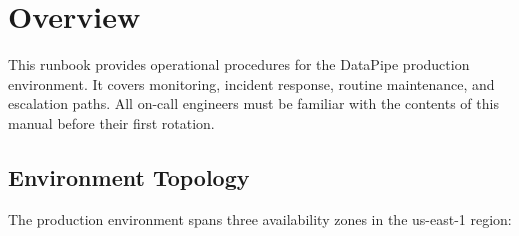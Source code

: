 \documentclass[
    language=english,
    doctype=manual,
    institution=none,
    titlestyle=book,
    oneside,
]{omnilatex}
\begin{document}
\maketitle

\tableofcontents

\chapter{Overview}
\label{sec:overview}

This runbook provides operational procedures for the DataPipe production
environment. It covers monitoring, incident response, routine
maintenance, and escalation paths. All on-call engineers must be familiar
with the contents of this manual before their first rotation.

\section{Environment Topology}

The production environment spans three availability zones in the
us-east-1 region:
\end{document}
